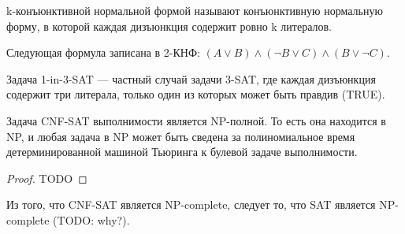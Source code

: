     \begin{Def}[k-КНФ]
    k-конъюнктивной нормальной формой называют конъюнктивную нормальную форму, в которой каждая дизъюнкция содержит ровно k литералов.
    \end{Def}
    \begin{Example}
    Следующая формула записана в 2-КНФ:
    $(A\lor B)\land (\neg B\lor C)\land (B\lor \neg C)$.
    \end{Example}
    \begin{Def}
    Задача 1-in-3-SAT --- частный случай задачи 3-SAT, где каждая дизъюнкция содержит три литерала, только один из которых может быть правдив (TRUE).
    \end{Def}
    \begin{Thm}
    Задача CNF-SAT выполнимости является NP-полной. То есть она находится в NP, и любая задача в NP может быть сведена за полиномиальное время детерминированной машиной Тьюринга к булевой задаче выполнимости.
    \end{Thm}
    \begin{proof}
    TODO
    \end{proof}
    \begin{Rem}
    Из того, что CNF-SAT является NP-complete, следует то, что SAT является NP-complete (TODO: why?).
    \end{Rem}

